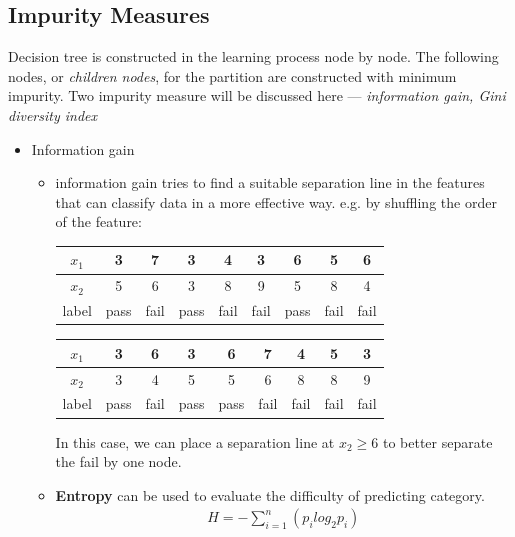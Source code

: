 \documentclass[a4paper,10pt]{article}
\begin{document}
\subsection{Impurity Measures}
Decision tree is constructed in the learning process node by node. The following nodes, or \textit{children nodes}, for the partition are constructed with minimum impurity. Two impurity measure will be discussed here --- \textit{information gain, Gini diversity index}
\begin{itemize}
    \item Information gain
        \begin{itemize}
            \item information gain tries to find a suitable separation line in the features that can classify data in a more effective way. e.g. by shuffling the order of the feature:
            \begin{table}[hbt]
                \centering
                \begin{tabular}{|c|c|c|c|c|c|c|c|c|}
                \hline
                $x_1$ & 3 & 7 & 3 & 4 & 3 & 6 & 5 & 6 \\ \hline
                $x_2$ & 5 & 6 & 3 & 8 & 9 & 5 & 8 & 4 \\ \hline
                label & pass & fail & pass & fail & fail & pass & fail & fail \\ \hline
                \end{tabular}
            \end{table}
            \begin{table}[hbt]
                \centering
                \begin{tabular}{|c|c|c|c|c|c|c|c|c|}
                \hline
                $x_1$ & 3 & 6 & 3 & 6 & 7 & 4 & 5 & 3 \\ \hline
                $x_2$ & 3 & 4 & 5 & 5 & 6 & 8 & 8 & 9 \\ \hline
                label & pass & fail & pass & pass & fail & fail & fail & fail \\ \hline
                \end{tabular}
            \end{table}
            In this case, we can place a separation line at $x_2\geq6$ to better separate the fail by one node. 
            \item \textbf{Entropy} can be used to evaluate the difficulty of predicting category.
            \begin{gather*}
                H = -\sum_{i = 1}^{n}(p_i log_2p_i)

\end{gather*}
\end{itemize}
\end{itemize}
\end{document}
